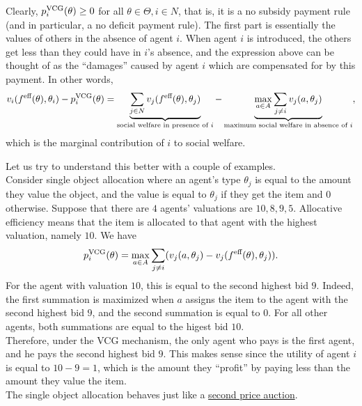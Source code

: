 		Clearly, $p_i^{\text{VCG}}(\theta) \ge 0$ for all $\theta \in \Theta,i \in N$, that is, it is a no subsidy payment rule (and in particular, a no deficit payment rule). The first part is essentially the values of others in the absence of agent $i$. When agent $i$ is introduced, the others get less than they could have in $i$'s absence, and the expression above can be thought of as the ``damages'' caused by agent $i$ which are compensated for by this payment. In other words,
		\[ v_i(f^{\text{eff}}(\theta),\theta_i) - p_i^{\text{VCG}}(\theta) = \underbrace{\sum_{j \in N} v_j(f^{\text{eff}}(\theta),\theta_j)}_{\text{social welfare in presence of $i$}} - \underbrace{\max_{a \in A} \sum_{j \ne i} v_j(a,\theta_j)}_{\text{maximum social welfare in absence of $i$}}, \]
		which is the marginal contribution of $i$ to social welfare.

		\begin{fex}
			Let us try to understand this better with a couple of examples.\\
			Consider single object allocation where an agent's type $\theta_j$ is equal to the amount they value the object, and the value is equal to $\theta_j$ if they get the item and $0$ otherwise. Suppose that there are $4$ agents' valuations are $10,8,9,5$. Allocative efficiency means that the item is allocated to that agent with the highest valuation, namely $10$. We have
			\[ p_i^{\text{VCG}}(\theta) = \max_{a \in A} \sum_{j \ne i} (v_j(a,\theta_j) - v_j(f^{\text{eff}}(\theta),\theta_j)). \]
			For the agent with valuation $10$, this is equal to the second highest bid $9$. Indeed, the first summation is maximized when $a$ assigns the item to the agent with the second highest bid $9$, and the second summation is equal to $0$. For all other agents, both summations are equal to the higest bid $10$.\\
			Therefore, under the VCG mechanism, the only agent who pays is the first agent, and he pays the second highest bid $9$. This makes sense since the utility of agent $i$ is equal to $10-9 = 1$, which is the amount they ``profit'' by paying less than the amount they value the item.\\
			The single object allocation behaves just like a \hyperref[ex: second price auction]{second price auction}.


\end{fex}
